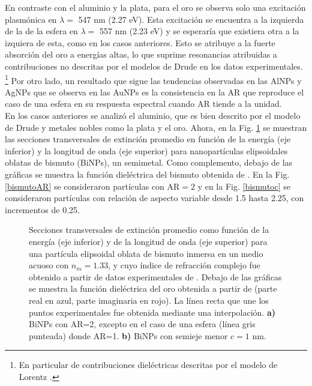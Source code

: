 En contraste con el aluminio y la plata, para el oro se observa solo una excitación plasmónica en $\lambda=$ 547 nm (2.27 eV). Esta excitación se encuentra a la izquierda de la de la esfera en $\lambda=$ 557 nm (2.23 eV) y se esperaría que existiera otra a la izquiera de esta, como en los casos anteriores. Esto se atribuye a la fuerte absorción del oro a energías altas, lo que suprime resonancias atribuidas a contribuciones no descritas por el modelos de Drude en los datos experimentales. \footnote{En particular de contribuciones dieléctricas descritas por el modelo de Lorentz \cite{Plasmonics}.} Por otro lado, un resultado que sigue las tendencias observadas en las AlNPs y AgNPs que se observa en las AuNPs es la consistencia en la AR que reproduce el caso de una esfera en su respuesta espectral cuando AR tiende a la unidad. \\

En los casos anteriores se analizó el aluminio, que es bien descrito por el modelo de Drude y metales nobles como la plata y el oro. Ahora, en la Fig. \ref{bismuto} se muestran las secciones transversales de extinción promedio en función de la energía (eje inferior) y la longitud de onda (eje superior) para nanopartículas elipsoidales oblatas de bismuto (BiNPs), un semimetal. Como complemento, debajo de las gráficas se muestra la función dieléctrica del bismuto obtenida de \cite{Bismuto}. En la Fig. \ref{bismutoAR} se consideraron partículas con  AR$=2$  y en la Fig. \ref{bismutoc} se consideraron partículas con relación de aspecto variable desde 1.5 hasta 2.25, con incrementos de 0.25. 

\begin{figure}[H]
	\quad%
	\caption{Secciones transversales de extinción promedio  como función de la energía (eje inferior) y de la longitud de onda (eje superior) para una partícula elipsoidal oblata de bismuto inmersa en un medio acuoso con $n_m=1.33$, y cuyo índice de refracción complejo fue obtenido a partir de datos experimentales de \cite{Bismuto}. Debajo de las gráficas se muestra la función dieléctrica del oro obtenida a partir de \cite{Plata} (parte real en azul, parte imaginaria en rojo). La línea recta que une los puntos experimentales fue obtenida mediante una interpolación. \textbf{a)} BiNPs con AR=2, excepto en el caso de una esfera (línea gris punteada) donde AR=1. \textbf{b)} BiNPs con semieje menor $c=1$ nm.}\label{bismuto}
\end{figure}

